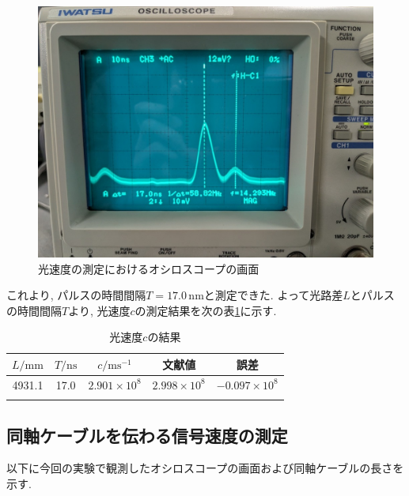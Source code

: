 \documentclass{jarticle}
\begin{document}
\begin{figure}[H]
  \begin{center}
    \includegraphics[scale=0.3]{lightspeed_result_picture.jpg}
    \caption{光速度の測定におけるオシロスコープの画面}
    \label{fg:lightspeed-oscilloscope}
  \end{center}
\end{figure}

これより, パルスの時間間隔$T=17.0\,\mathrm{nm}$と測定できた.
よって光路差$L$とパルスの時間間隔$T$より, 光速度$c$の測定結果を次の表\ref{tb:lightspeed-result}に示す.

\begin{table}[h]
  \centering
  \caption{光速度$c$の結果}
  \begin{tabular}{ccccc}
    \hline
    $L/\mathrm{mm}$ & $T/\mathrm{ns}$ & $c/\mathrm{ms^{-1}}$ & 文献値\cite{light-speed} & 誤差 \\
    \hline
    4931.1 & 17.0 & $2.901\times10^8$ & $2.998\times10^8$ & $-0.097\times10^8$ \\
    \hline
    \label{tb:lightspeed-result}
  \end{tabular}
\end{table}



\subsection{同軸ケーブルを伝わる信号速度の測定}

以下に今回の実験で観測したオシロスコープの画面および同軸ケーブルの長さを示す.
\end{document}
